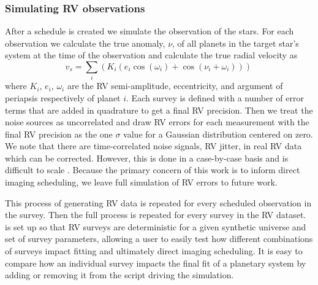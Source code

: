 \subsubsection{Simulating RV observations}
After a schedule is created we simulate the observation of the stars. For each
observation we calculate the true anomaly, $\nu$, of all planets in the target
star's system at the time of the observation and calculate the true radial
velocity as 
\begin{equation}
v_s = \sum_i \left(K_i \left(e_i
\cos(\omega_i) + \cos(\nu_i + \omega_i)\right)\right) \,
  \label{eq:system_rv}
\end{equation}
where $K_i$, $e_i$, $\omega_i$ are the RV semi-amplitude, eccentricity, and
argument of periapsis respectively of planet $i$. Each survey is defined
with a number of error terms that are added in quadrature to get a final RV
precision. Then we treat the noise sources as uncorrelated and draw RV errors
for each measurement with the final RV precision as the one $\sigma$ value for
a Gaussian distribution centered on zero. We note that there are
time-correlated noise signals, RV jitter, in real RV data which can be
corrected. However, this is done in a case-by-case basis and is difficult to
scale \citep{guptaTargetPrioritization2021}. Because the primary concern of
this work is to inform direct imaging scheduling, we leave full simulation of
RV errors to future work.


This process of generating RV data is repeated for every scheduled observation in the
survey. Then the full process is repeated for every survey in the
RV dataset.  is set up so that RV surveys are deterministic
for a given synthetic universe and set of survey parameters, allowing a user to
easily test how different combinations of surveys impact fitting and
ultimately direct imaging scheduling. It is easy to compare how an individual
survey impacts the final fit of a planetary system by adding or removing
it from the script driving the simulation.

